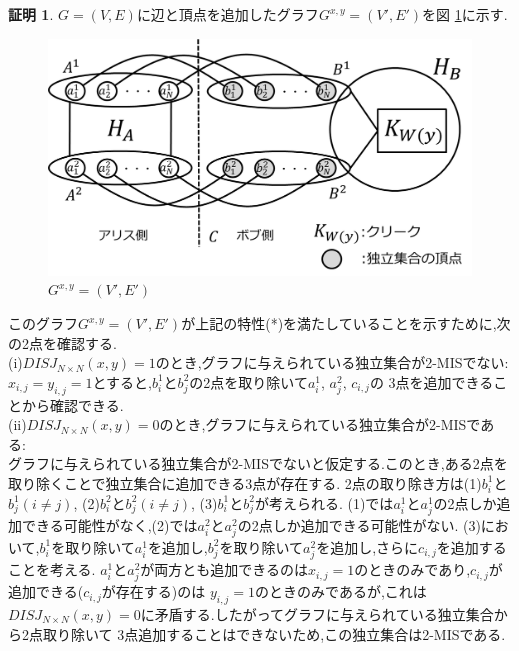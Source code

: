\documentclass[12pt]{thesis}
\theoremstyle{definition}
\newtheorem*{prf*}{証明}
\begin{document}
\begin{prf*}
$G = (V, E)$に辺と頂点を追加したグラフ$G^{x, y} = (V', E')$を図 \ref{2_G(x,y)}に示す.

\begin{figure}[ht]
\begin{center}
\includegraphics[width=120mm]{2_Gxy.png}
\end{center}
\caption{$G^{x, y} = (V', E')$}
\label{2_G(x,y)}
\end{figure}

このグラフ$G^{x, y} = (V', E')$が上記の特性(*)を満たしていることを示すために,次の2点を確認する. \\
(i)$DISJ_{N \times N} (x, y) = 1$のとき,グラフに与えられている独立集合が2-MISでない: \\
$x_{i, j} = y_{i, j} =1$とすると,$b_{i}^{1}$と$b_{j}^{2}$の2点を取り除いて$a_{i}^{1}$, $a_{j}^{2}$, $c_{i, j}$の
3点を追加できることから確認できる. \\
(ii)$DISJ_{N \times N} (x, y) = 0$のとき,グラフに与えられている独立集合が2-MISである: \\ 
グラフに与えられている独立集合が2-MISでないと仮定する.このとき,ある2点を取り除くことで独立集合に追加できる3点が存在する.
2点の取り除き方は(1)$b_{i}^{1}$と$b_{j}^{1}(i \neq j)$, (2)$b_{i}^{2}$と$b_{j}^{2}(i \neq j)$, (3)$b_{i}^{1}$と$b_{j}^{2}$が考えられる.
(1)では$a_{i}^{1}$と$a_{j}^{1}$の2点しか追加できる可能性がなく,(2)では$a_{i}^{2}$と$a_{j}^{2}$の2点しか追加できる可能性がない.
(3)において,$b_{i}^{1}$を取り除いて$a_{i}^{1}$を追加し,$b_{j}^{2}$を取り除いて$a_{j}^{2}$を追加し,さらに$c_{i, j}$を追加することを考える.
$a_{i}^{1}$と$a_{j}^{2}$が両方とも追加できるのは$x_{i, j} = 1$のときのみであり,$c_{i, j}$が追加できる($c_{i, j}$が存在する)のは
$y_{i, j} = 1$のときのみであるが,これは$DISJ_{N \times N} (x, y) = 0$に矛盾する.したがってグラフに与えられている独立集合から2点取り除いて
3点追加することはできないため,この独立集合は2-MISである.


\end{prf*}
\end{document}
